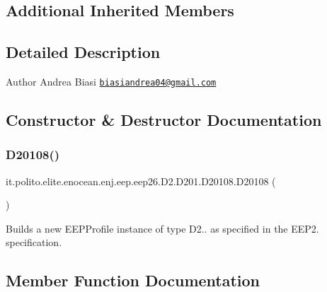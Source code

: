 \subsection*{Additional Inherited Members}


\subsection{Detailed Description}
\begin{DoxyAuthor}{Author}
Andrea Biasi \href{mailto:biasiandrea04@gmail.com}{\tt biasiandrea04@gmail.\+com} 
\end{DoxyAuthor}


\subsection{Constructor \& Destructor Documentation}
\hypertarget{classit_1_1polito_1_1elite_1_1enocean_1_1enj_1_1eep_1_1eep26_1_1_d2_1_1_d201_1_1_d20108_a07bc2cea9684381e8351232f4f6526f2}{}\label{classit_1_1polito_1_1elite_1_1enocean_1_1enj_1_1eep_1_1eep26_1_1_d2_1_1_d201_1_1_d20108_a07bc2cea9684381e8351232f4f6526f2} 
\subsubsection{\texorpdfstring{D20108()}{D20108()}}
{\footnotesize\ttfamily it.\+polito.\+elite.\+enocean.\+enj.\+eep.\+eep26.\+D2.\+D201.\+D20108.\+D20108 (\begin{DoxyParamCaption}{ }\end{DoxyParamCaption})}

Builds a new E\+E\+P\+Profile instance of type D2.. as specified in the E\+E\+P2. specification. 

\subsection{Member Function Documentation}
\hypertarget{classit_1_1polito_1_1elite_1_1enocean_1_1enj_1_1eep_1_1eep26_1_1_d2_1_1_d201_1_1_d20108_acb910910d58e326fd387a523a0461b5b}{}\label{classit_1_1polito_1_1elite_1_1enocean_1_1enj_1_1eep_1_1eep26_1_1_d2_1_1_d201_1_1_d20108_acb910910d58e326fd387a523a0461b5b} 
